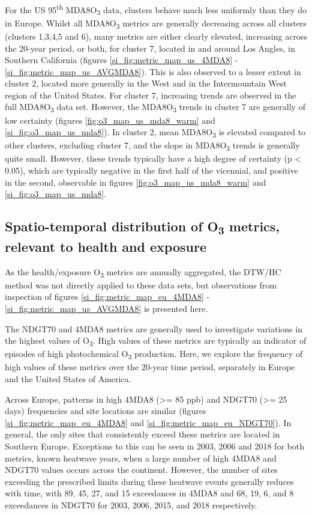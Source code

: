 \documentclass[journal abbreviation, manuscript]{copernicus}
\begin{document}
For the US 95\textsuperscript{th} MDA8O\textsubscript{3} data, clusters behave much less uniformly than they do in Europe. Whilst all MDA8O\textsubscript{3} metrics are generally decreasing across all clusters (clusters 1,3,4,5 and 6), many metrics are either clearly elevated, increasing across the 20-year period, or both, for cluster 7, located in and around Los Angles, in Southern California (figures \ref{si_fig:metric_map_us_4MDA8} - \ref{si_fig:metric_map_us_AVGMDA8}). This is also observed to a lesser extent in cluster 2, located more generally in the West and in the Intermountain West region of the United States. For cluster 7, increasing trends are observed in the full MDA8O\textsubscript{3} data set. However, the MDA8O\textsubscript{3} trends in cluster 7 are generally of low certainty (figures \ref{fig:o3_map_us_mda8_warm} and \ref{si_fig:o3_map_us_mda8}). In cluster 2, mean MDA8O\textsubscript{3} is elevated compared to other clusters, excluding cluster 7, and the slope in MDA8O\textsubscript{3} trends is generally quite small. However, these trends typically have a high degree of certainty (p < 0.05), which are typically negative in the first half of the vicennial, and positive in the second, observable in figures \ref{fig:o3_map_us_mda8_warm} and \ref{si_fig:o3_map_us_mda8}. 

\subsection{Spatio-temporal distribution of O\textsubscript{3} metrics, relevant to health and exposure} \label{sect:metrics_distribution}

As the health/exposure O\textsubscript{3} metrics are annually aggregated, the DTW/HC method was not directly applied to these data sets, but observations from inspection of figures \ref{si_fig:metric_map_eu_4MDA8} - \ref{si_fig:metric_map_us_AVGMDA8} is presented here. 

The NDGT70 and 4MDA8 metrics are generally used to investigate variations in the highest values of O\textsubscript{3}. High values of these metrics are typically an indicator of episodes of high photochemical O\textsubscript{3} production. Here, we explore the frequency of high values of these metrics over the 20-year time period, separately in Europe and the United States of America.

Across Europe, patterns in high 4MDA8 (>= 85 ppb) and NDGT70 (>= 25 days) frequencies and site locations are similar (figures \ref{si_fig:metric_map_eu_4MDA8} and \ref{si_fig:metric_map_eu_NDGT70}). In general, the only sites that consistently exceed these metrics are located in Southern Europe. Exceptions to this can be seen in 2003, 2006 and 2018 for both metrics, known heatwave years, when a large number of high 4MDA8 and NDGT70 values occurs across the continent. However, the number of sites exceeding the prescribed limits during these heatwave events generally reduces with time, with 89, 45, 27, and 15 exceedances in 4MDA8 and 68, 19, 6, and 8 exceedances in NDGT70 for 2003, 2006, 2015, and 2018 respectively.
\end{document}
